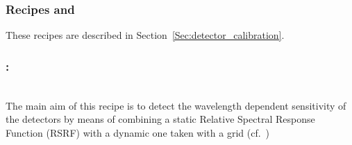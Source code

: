\subsubsection{Recipes  and }
These recipes are described in Section~\ref{Sec:detector_calibration}.

\subsubsection{:}
\\
The main aim of this recipe is to detect the wavelength dependent
sensitivity of the detectors by means of combining a static Relative Spectral Response Function (\ac{RSRF}) with a dynamic one taken with a grid (cf.~\cite{METIS-calibration_plan})


